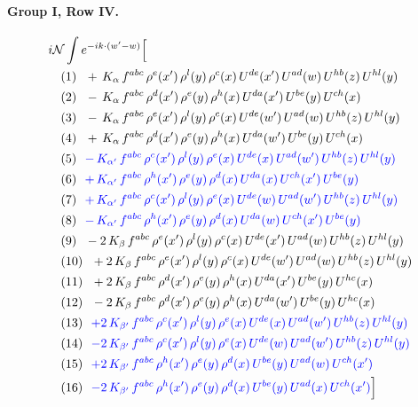 \documentclass[10pt]{article}
\numberwithin{equation}{section}
\newcommand{\NN}{\mathcal N}
\begin{document}
\paragraph{Group I, Row IV.}
\begin{align*}
&i\NN\int e^{-ik\cdot(w'-w)}\Big[\\
&\quad\text{(1)}\ \ +\,K_{\alpha}\,f^{abc}\,\rho^{e}(x')\,\rho^{l}(y)\,\rho^{c}(x)\,U^{de}(x')\,U^{ad}(w)\,U^{hb}(z)\,U^{hl}(y)\\
&\quad\text{(2)}\ \ -\,K_{\alpha}\,f^{abc}\,\rho^{d}(x')\,\rho^{e}(y)\,\rho^{h}(x)\,U^{da}(x')\,U^{be}(y)\,U^{ch}(x)\\
&\quad\text{(3)}\ \ -\,K_{\alpha}\,f^{abc}\,\rho^{e}(x')\,\rho^{l}(y)\,\rho^{c}(x)\,U^{de}(w')\,U^{ad}(w)\,U^{hb}(z)\,U^{hl}(y)\\
&\quad\text{(4)}\ \ +\,K_{\alpha}\,f^{abc}\,\rho^{d}(x')\,\rho^{e}(y)\,\rho^{h}(x)\,U^{da}(w')\,U^{be}(y)\,U^{ch}(x)\\
&\quad\text{(5)}\ \ \textcolor{blue}{-\,K_{\alpha'}\,f^{abc}\,\rho^{c}(x')\,\rho^{l}(y)\,\rho^{e}(x)\,U^{de}(x)\,U^{ad}(w')\,U^{hb}(z)\,U^{hl}(y)}\\
&\quad\text{(6)}\ \ \textcolor{blue}{+\,K_{\alpha'}\,f^{abc}\,\rho^{h}(x')\,\rho^{e}(y)\,\rho^{d}(x)\,U^{da}(x)\,U^{ch}(x')\,U^{be}(y)}\\
&\quad\text{(7)}\ \ \textcolor{blue}{+\,K_{\alpha'}\,f^{abc}\,\rho^{c}(x')\,\rho^{l}(y)\,\rho^{e}(x)\,U^{de}(w)\,U^{ad}(w')\,U^{hb}(z)\,U^{hl}(y)}\\
&\quad\text{(8)}\ \ \textcolor{blue}{-\,K_{\alpha'}\,f^{abc}\,\rho^{h}(x')\,\rho^{e}(y)\,\rho^{d}(x)\,U^{da}(w)\,U^{ch}(x')\,U^{be}(y)}\\
&\quad\text{(9)}\ \ -2\,K_{\beta}\,f^{abc}\,\rho^{e}(x')\,\rho^{l}(y)\,\rho^{c}(x)\,U^{de}(x')\,U^{ad}(w)\,U^{hb}(z)\,U^{hl}(y)\\
&\quad\text{(10)}\ \ +2\,K_{\beta}\,f^{abc}\,\rho^{e}(x')\,\rho^{l}(y)\,\rho^{c}(x)\,U^{de}(w')\,U^{ad}(w)\,U^{hb}(z)\,U^{hl}(y)\\
&\quad\text{(11)}\ \ +2\,K_{\beta}\,f^{abc}\,\rho^{d}(x')\,\rho^{e}(y)\,\rho^{h}(x)\,U^{da}(x')\,U^{be}(y)\,U^{hc}(x)\\
&\quad\text{(12)}\ \ -2\,K_{\beta}\,f^{abc}\,\rho^{d}(x')\,\rho^{e}(y)\,\rho^{h}(x)\,U^{da}(w')\,U^{be}(y)\,U^{hc}(x)\\
&\quad\text{(13)}\ \ \textcolor{blue}{+2\,K_{\beta'}\,f^{abc}\,\rho^{c}(x')\,\rho^{l}(y)\,\rho^{e}(x)\,U^{de}(x)\,U^{ad}(w')\,U^{hb}(z)\,U^{hl}(y)}\\
&\quad\text{(14)}\ \ \textcolor{blue}{-2\,K_{\beta'}\,f^{abc}\,\rho^{c}(x')\,\rho^{l}(y)\,\rho^{e}(x)\,U^{de}(w)\,U^{ad}(w')\,U^{hb}(z)\,U^{hl}(y)}\\
&\quad\text{(15)}\ \ \textcolor{blue}{+2\,K_{\beta'}\,f^{abc}\,\rho^{h}(x')\,\rho^{e}(y)\,\rho^{d}(x)\,U^{be}(y)\,U^{ad}(w)\,U^{ch}(x')}\\
&\quad\text{(16)}\ \ \textcolor{blue}{-2\,K_{\beta'}\,f^{abc}\,\rho^{h}(x')\,\rho^{e}(y)\,\rho^{d}(x)\,U^{be}(y)\,U^{ad}(x)\,U^{ch}(x')}\Big]
\end{align*}
\end{document}
